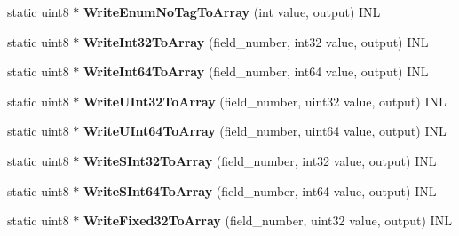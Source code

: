 \begin{DoxyCompactItemize}
static uint8 $\ast$ {\bfseries Write\+Enum\+No\+Tag\+To\+Array} (int value, output) I\+NL
\item 
\mbox{\label{classgoogle_1_1protobuf_1_1internal_1_1WireFormatLite_a0e71653393842ca3e8421ed2c01323fe}} 
static uint8 $\ast$ {\bfseries Write\+Int32\+To\+Array} (field\+\_\+number, int32 value, output) I\+NL
\item 
\mbox{\label{classgoogle_1_1protobuf_1_1internal_1_1WireFormatLite_accc3eb2ed28d9df47ad423b7b6c0aaa6}} 
static uint8 $\ast$ {\bfseries Write\+Int64\+To\+Array} (field\+\_\+number, int64 value, output) I\+NL
\item 
\mbox{\label{classgoogle_1_1protobuf_1_1internal_1_1WireFormatLite_afaee5e7f83029170e7e40f318505c0ff}} 
static uint8 $\ast$ {\bfseries Write\+U\+Int32\+To\+Array} (field\+\_\+number, uint32 value, output) I\+NL
\item 
\mbox{\label{classgoogle_1_1protobuf_1_1internal_1_1WireFormatLite_a61a86b37d65dc7cec00b312d33715fb4}} 
static uint8 $\ast$ {\bfseries Write\+U\+Int64\+To\+Array} (field\+\_\+number, uint64 value, output) I\+NL
\item 
\mbox{\label{classgoogle_1_1protobuf_1_1internal_1_1WireFormatLite_a236e386b8ab32786b9d5bbf9e2920693}} 
static uint8 $\ast$ {\bfseries Write\+S\+Int32\+To\+Array} (field\+\_\+number, int32 value, output) I\+NL
\item 
\mbox{\label{classgoogle_1_1protobuf_1_1internal_1_1WireFormatLite_ab7b8b74a4165b92438f567c15e59d812}} 
static uint8 $\ast$ {\bfseries Write\+S\+Int64\+To\+Array} (field\+\_\+number, int64 value, output) I\+NL
\item 
\mbox{\label{classgoogle_1_1protobuf_1_1internal_1_1WireFormatLite_adb2a8bbffc8731b3cbeceab8a8aff2ae}} 
static uint8 $\ast$ {\bfseries Write\+Fixed32\+To\+Array} (field\+\_\+number, uint32 value, output) I\+NL
\item 

\end{DoxyCompactItemize}

